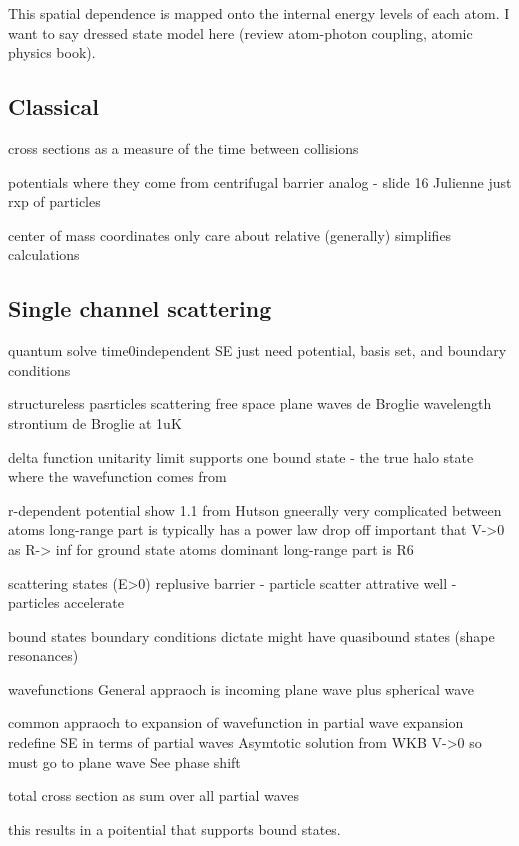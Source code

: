 This spatial dependence is mapped onto the internal energy levels of each atom. I want to say dressed state model here (review atom-photon coupling, atomic physics book).


\subsection{Classical} \label{ssec:classical}


cross sections
			as a measure of the time between collisions
			
		potentials
			where they come from
		centrifugal barrier
			analog - slide 16 Julienne
			just rxp of particles
			
		center of mass coordinates
			only care  about relative (generally)
			simplifies calculations

\subsection{Single channel scattering} \label{ssec:single_chan}
quantum
	solve time0independent SE
	just need potential, basis set, and boundary conditions
		
structureless pasrticles scattering
	free space
		plane waves
		de Broglie wavelength
			strontium de Broglie at 1uK
	
	delta function
		unitarity limit
		supports one bound state - the true halo state
		where the wavefunction comes from

	r-dependent potential
		show 1.1 from Hutson
		gneerally very complicated between atoms
			long-range part is typically has a power law drop off
			important that V->0 as R-> inf
		for ground state atoms dominant long-range part is R6
		
	scattering states (E>0)
		replusive barrier - particle scatter
		attrative well - particles accelerate
		
	bound states
		boundary conditions dictate
		might have quasibound states (shape resonances)
		
	wavefunctions
		General appraoch is incoming plane wave plus spherical wave
			
		common appraoch to expansion of wavefunction in partial wave expansion
			redefine SE in terms of partial waves
				Asymtotic solution from WKB
					V->0 so must go to plane wave
					See phase shift
					
		total cross section as sum over all partial waves

this results in a poitential that supports bound states. 

